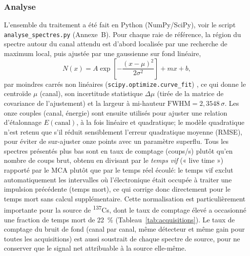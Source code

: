 \documentclass[11pt,letterpaper]{article}
\newcommand{\beq}[1]{\begin{equation} \label{#1}}
\def\enq{\end{equation}}
\begin{document}
\subsubsection*{Analyse}
L'ensemble du traitement a été fait en Python (NumPy/SciPy), voir le script \texttt{analyse\_spectres.py} (Annexe~B). Pour chaque raie de référence, la région du spectre autour du canal attendu est d'abord localisée par une recherche de maximum local, puis ajustée par une gaussienne sur fond linéaire,
\beq{eq:gauss}
    N(x) = A \exp\!\left[-\frac{(x-\mu)^2}{2\sigma^2}\right] + mx + b ,
\enq
par moindres carrés non linéaires (\texttt{scipy.optimize.curve\_fit}) \cite{bevington}, ce qui donne le centroïde $\mu$ (canal), son incertitude statistique $\Delta\mu$ (tirée de la matrice de covariance de l'ajustement) et la largeur à mi-hauteur $\text{FWHM} = 2{,}3548\,\sigma$. Les onze couples (canal, énergie) sont ensuite utilisés pour ajuster une relation d'étalonnage $E(\text{canal})$, à la fois linéaire et quadratique; le modèle quadratique n'est retenu que s'il réduit sensiblement l'erreur quadratique moyenne (RMSE), pour éviter de sur-ajuster onze points avec un paramètre superflu. Tous les spectres présentés plus bas sont en taux de comptage (coups/s) plutôt qu'en nombre de coups brut, obtenu en divisant par le \emph{temps vif} (« live time ») rapporté par le MCA plutôt que par le temps réel écoulé: le temps vif exclut automatiquement les intervalles où l'électronique était occupée à traiter une impulsion précédente (temps mort), ce qui corrige donc directement pour le temps mort sans calcul supplémentaire. Cette normalisation est particulièrement importante pour la source de \textsuperscript{137}Cs, dont le taux de comptage élevé a occasionné une fraction de temps mort de 22~\% (Tableau~\ref{tab:acquisitions}). Le taux de comptage du bruit de fond (canal par canal, même détecteur et même gain pour toutes les acquisitions) est aussi soustrait de chaque spectre de source, pour ne conserver que le signal net attribuable à la source elle-même.
\end{document}
